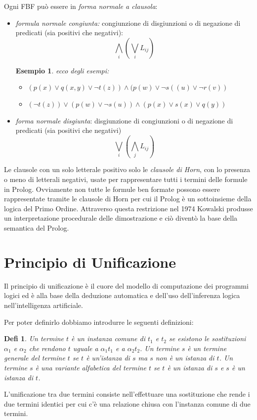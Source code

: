 \documentclass[a4paper]{book}
\newtheorem*{defi}{Defi}%
\newtheorem*{esempio}{Esempio}
\begin{document}
Ogni FBF può essere in \emph{forma normale a clausola}:
\begin{itemize}
\item \emph{formula normale congiunta:} congiunzione di disgiunzioni o di negazione di predicati (sia positivi che negativi):
  \begin{equation*}
    \bigwedge_i(\bigvee_iL_{ij})
  \end{equation*}
\begin{esempio}
ecco degli esempi:
\begin{itemize}
\item $(p(x)\lor q(x,y)\lor \neg t(z))\land(p(w)\lor \neg s((u)\lor \neg r(v))$
\item $(\neg t(z))\lor (p(w)\lor \neg s(u))\land (p(x)\lor s(x)\lor q(y))$
\end{itemize}
\end{esempio}

\item \textit{forma normale disgiunta}: disgiunzione di congiunzioni o di negazione di predicati (sia positivi che negativi)
  \begin{equation*}
    \bigvee_i(\bigwedge_j L_{ij})
  \end{equation*}
\end{itemize}
Le clausole con un solo letterale positivo solo le \textit{clausole di Horn}, con lo presenza o meno di letterali negativi,
usate per rappresentare tutti i termini delle formule in Prolog.\newline
Ovviamente non tutte le formule ben formate possono essere rappresentate tramite le clausole di Horn per cui il Prolog è un sottoinsieme
della logica del Primo Ordine.\newline
Attraverso questa restrizione nel 1974 Kowalski produsse un interpretazione procedurale delle dimostrazione e ciò diventò la base
della semantica del Prolog.
\section{Principio di Unificazione}
Il principio di unificazione è il cuore del modello di computazione dei programmi logici ed è alla base della deduzione automatica
e dell'uso dell'inferenza logica nell'intelligenza artificiale.

Per poter definirlo dobbiamo introdurre le seguenti definizioni:
\begin{defi}
Un termine $t$ è un instanza comune  di $t_1$ e $t_2$ se esistono le sostituzioni $\alpha_1$ e $\alpha_2$
che rendono $t$ uguale a $\alpha_1t_1$ e a $\alpha_2t_2$.\newline
Un termine $s$ è un termine generale del termine $t$ se $t$ è un'istanza di $s$ ma $s$ non è un istanza di $t$.\newline
Un termine $s$ è una variante alfabetica del termine $t$ se $t$ è un istanza di $s$ e $s$ è un istanza di $t$.
\end{defi}
L'unificazione tra due termini consiste nell'effettuare una sostituzione che rende i due termini identici
per cui c'è una relazione chiusa con l'instanza comune di due termini.
\end{document}
